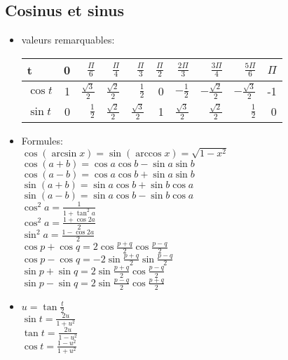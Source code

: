 \documentclass[fleqn]{article}
\theoremstyle{definition} \newtheorem*{defi}{D\'efinition}
\theoremstyle{definition} \newtheorem*{theo}{Th\'eor\`eme}
\begin{document}
\subsection{Cosinus et sinus}
\begin{itemize}
	\item valeurs remarquables:\\
		\begin{tabular}{@{}lrrrrrrrrr@{}}
			\toprule
			t & 0 & $\frac{\Pi}{6}$ & $\frac{\Pi}{4}$ & $\frac{\Pi}{3}$ & $\frac{\Pi}{2}$ & $\frac{2\Pi}{3}$ & $\frac{3\Pi}{4}$
				& $\frac{5\Pi}{6}$ & $\Pi$ \\
			\hline
			$\cos t$ & 1 & $\frac{\sqrt{3}}{2}$ & $\frac{\sqrt{2}}{2}$ & $\frac{1}{2}$ & 0 & $-\frac{1}{2}$ & $-\frac{\sqrt{2}}{2}$
				& $-\frac{\sqrt{3}}{2}$ & -1 \\
			$\sin t$ & 0 & $\frac{1}{2}$ & $\frac{\sqrt{2}}{2}$ & $\frac{\sqrt{3}}{2}$ & 1 & $\frac{\sqrt{3}}{2}$ & $\frac{\sqrt{2}}{2}$
				& $\frac{1}{2}$ & 0 \\
			\bottomrule
		\end{tabular}

	\item Formules: \\
		$\cos(\arcsin x) = \sin(\arccos x) = \sqrt{1 - x^2}$ \\
		$\cos (a+b) = \cos a\cos b - \sin a\sin b$ \\
		$\cos (a-b) = \cos a\cos b + \sin a\sin b$ \\
		$\sin (a+b) = \sin a\cos b + \sin b\cos a$ \\
		$\sin (a-b) = \sin a\cos b - \sin b\cos a$ \\
		$\cos^2 a = \frac{1}{1 + \tan^2a}$ \\
		$\cos^2 a = \frac{1 + \cos 2a}{2}$ \\
		$\sin^2 a = \frac{1 - \cos 2a}{2}$ \\
		\newline
		$\cos p + \cos q = 2\cos\frac{p+q}{2}\cos\frac{p-q}{2}$ \\
		$\cos p - \cos q = -2\sin\frac{p+q}{2}\sin\frac{p-q}{2}$ \\
		$\sin p + \sin q = 2\sin\frac{p+q}{2}\cos\frac{p-q}{2}$ \\
		$\sin p - \sin q = 2\sin\frac{p-q}{2}\cos\frac{p+q}{2}$ \\

	\item $u = \tan \frac{t}{2}$\\
		$\sin t = \frac{2u}{1+u^2}$\\
		$\tan t = \frac{2u}{1-u^2}$\\
		$\cos t = \frac{1-u^2}{1+u^2}$

\end{itemize}
\end{document}

